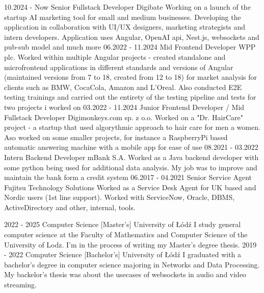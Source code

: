 \documentclass[9pt]{developercv}%
\begin{document}
\begin{entrylist}
	\entry
	{10.2024 - Now}
	{Senior Fullstack Developer}
	{Digibate}
	{Working on a launch of the startup AI marketing tool for small and medium businesses. Developing the application in collaboration with UI/UX designers, marketing strategists and intern developers. Application uses Angular, OpenAI api, Nest.js, websockets and pub-sub model and much more}
	\entry
	{06.2022 - 11.2024}
	{Mid Frontend Developer}
	{WPP plc.}
	{Worked within multiple Angular projects - created standalone and microfrontend applications in different standards and versions of Angular (maintained versions from 7 to 18, created from 12 to 18) for market analysis for clients such as BMW, CocaCola, Amazon and L'Oreal. Also conducted E2E testing trainings and carried out the entirety of the testing pipeline and tests for two projects i worked on}
	\entry
	{03.2022 - 11.2024}
	{Junior Frontend Developer / Mid Fullstack Developer}
	{Digimonkeys.com sp. z o.o.}
	{Worked on a "Dr. HairCare" project - a startup that used algorythmic approach to hair care for men a women. Aso worked on some smaller projects, for instance a RaspberryPi based automatic answering machine with a mobile app for ease of use}
	\entry
	{08.2021 - 03.2022}
	{Intern Backend Developer}
	{mBank S.A.}
	{Worked as a Java backend developer with some python being used for additional data analysis. My job was to improve and maintain the bank form a credit system}
	\entry
	{06.2017 - 04.2021}
	{Senior Service Agent}
	{Fujitsu Technology Solutions}
	{Worked as a Service Desk Agent for UK based and Nordic users (1st line support). Worked with ServiceNow, Oracle, DBMS, ActiveDirectory and other, internal, tools.}
\end{entrylist}

\clearpage


\begin{entrylist}
	\entry
	{2022 - 2025}
	{Computer Science [Master's]}
	{University of Łódź}
	{I study general computer science at the Faculty of Mathematics and Computer Science of the University of Lodz. I'm in the process of writing my Master's degree thesis.}
	\entry
	{2019 - 2022}
	{Computer Science [Bachelor's]}
	{University of Łódź}
	{I graduated with a bachelor's degree in computer science majoring in Networks and Data Processing. My backelor's thesis was about the usecases of websockets in audio and video streaming.}
\end{entrylist}
\end{document}

